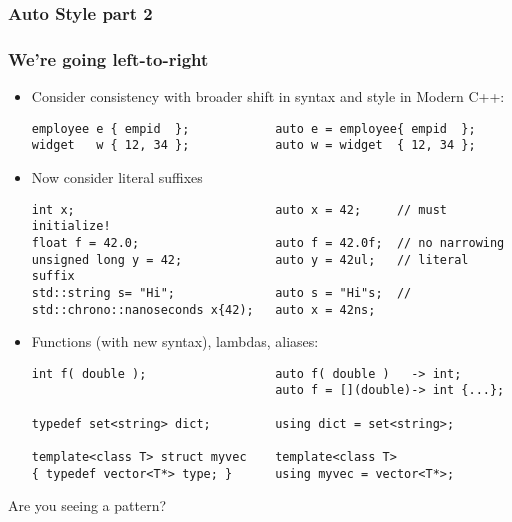 \begin{frame}[fragile]
\frametitle{Auto Style part 2}
\frametitle{We're going left-to-right}
\begin{itemize}[<+->]
\item Consider consistency with broader shift in syntax and style in
  Modern C++:
{\scriptsize \begin{verbatim}
employee e { empid  };            auto e = employee{ empid  };
widget   w { 12, 34 };            auto w = widget  { 12, 34 };
\end{verbatim} }
\item Now consider literal suffixes
{\scriptsize \begin{verbatim}
int x;                            auto x = 42;     // must initialize!
float f = 42.0;                   auto f = 42.0f;  // no narrowing
unsigned long y = 42;             auto y = 42ul;   // literal suffix
std::string s= "Hi";              auto s = "Hi"s;  //
std::chrono::nanoseconds x{42);   auto x = 42ns;
\end{verbatim} }
\item Functions (with new syntax), lambdas, aliases:
{\scriptsize \begin{verbatim}
int f( double );                  auto f( double )   -> int; 
                                  auto f = [](double)-> int {...};

typedef set<string> dict;         using dict = set<string>;

template<class T> struct myvec    template<class T>
{ typedef vector<T*> type; }      using myvec = vector<T*>;
\end{verbatim} }
\end{itemize} %
Are you seeing a pattern?
\end{frame}



